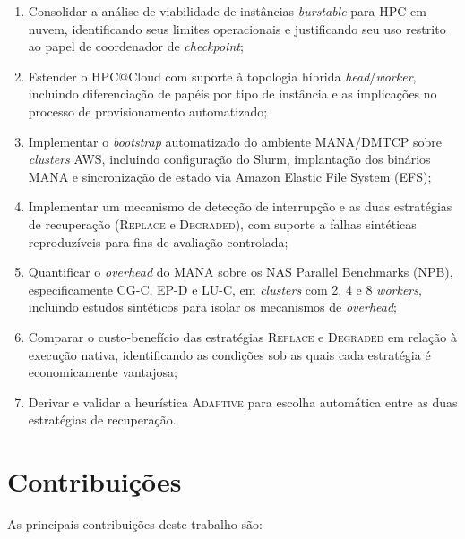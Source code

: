 \begin{enumerate}
  \item Consolidar a análise de viabilidade de instâncias \textit{burstable} para HPC
        em nuvem, identificando seus limites operacionais e justificando seu uso
        restrito ao papel de coordenador de \textit{checkpoint};
  \item Estender o HPC@Cloud com suporte à topologia híbrida
        \textit{head}/\textit{worker}, incluindo diferenciação de papéis por tipo de
        instância e as implicações no processo de provisionamento automatizado;
  \item Implementar o \textit{bootstrap} automatizado do ambiente MANA/DMTCP sobre
        \textit{clusters} AWS, incluindo configuração do Slurm, implantação dos binários MANA
        e sincronização de estado via Amazon Elastic File System (EFS);
  \item Implementar um mecanismo de detecção de interrupção e as duas estratégias de
        recuperação (\textsc{Replace} e \textsc{Degraded}), com suporte a falhas
        sintéticas reproduzíveis para fins de avaliação controlada;
  \item Quantificar o \textit{overhead} do MANA sobre os NAS Parallel Benchmarks (NPB),
        especificamente CG-C, EP-D e LU-C, em \textit{clusters} com 2, 4 e 8 \textit{workers}, incluindo
        estudos sintéticos para isolar os mecanismos de \textit{overhead};
  \item Comparar o custo-benefício das estratégias \textsc{Replace} e \textsc{Degraded}
        em relação à execução nativa, identificando as condições sob as quais cada
        estratégia é economicamente vantajosa;
  \item Derivar e validar a heurística \textsc{Adaptive} para escolha automática
        entre as duas estratégias de recuperação.
\end{enumerate}


\section{Contribuições}
\label{sec:contribuicoes}

As principais contribuições deste trabalho são:


